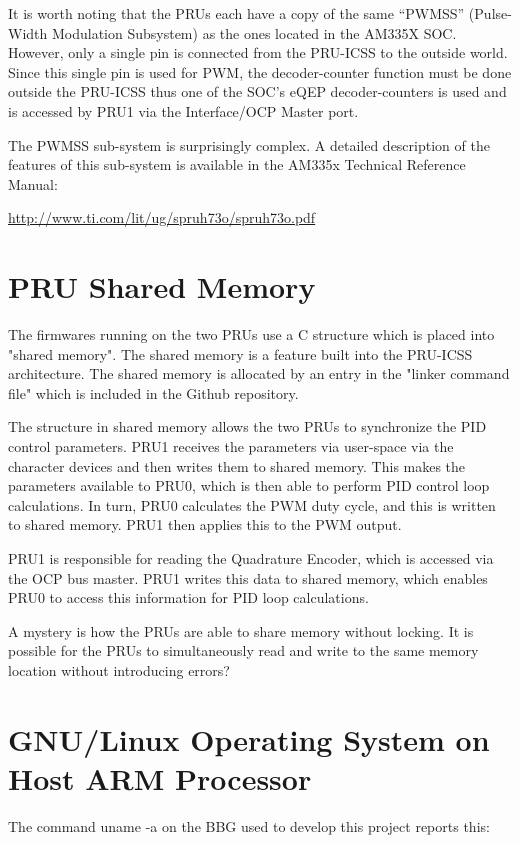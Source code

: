 It is worth noting that the PRUs each have a copy of the same ``PWMSS'' (Pulse-Width Modulation Subsystem) as the ones located in the AM335X SOC.  However, only a single pin is connected from the PRU-ICSS to the outside world.  Since this single pin is used for PWM, the decoder-counter function must be done outside the PRU-ICSS thus one of the SOC's eQEP decoder-counters is used and is accessed by PRU1 via the Interface/OCP Master port.

The PWMSS sub-system is surprisingly complex.  A detailed description of the features of this sub-system is available in the AM335x Technical Reference Manual:

\url{http://www.ti.com/lit/ug/spruh73o/spruh73o.pdf}

\section{PRU Shared Memory}

The firmwares running on the two PRUs use a C structure which is placed into "shared memory".  The shared memory is a feature built into the PRU-ICSS architecture.  The shared memory is allocated by an entry in the "linker command file" which is included in the Github repository.

The structure in shared memory allows the two PRUs to synchronize the PID control parameters.  PRU1 receives the parameters via user-space via the character devices and then writes them to shared memory.  This makes the parameters available to PRU0, which is then able to perform PID control loop calculations.  In turn, PRU0 calculates the PWM duty cycle, and this is written to shared memory.  PRU1 then applies this to the PWM output.

PRU1 is responsible for reading the Quadrature Encoder, which is accessed via the OCP bus master.  PRU1 writes this data to shared memory, which enables PRU0 to access this information for PID loop calculations.

A mystery is how the PRUs are able to share memory without locking.  It is possible for the PRUs to simultaneously read and write to the same memory location without introducing errors?

\section{GNU/Linux Operating System on Host ARM Processor}

The command uname -a on the BBG used to develop this project reports this:

